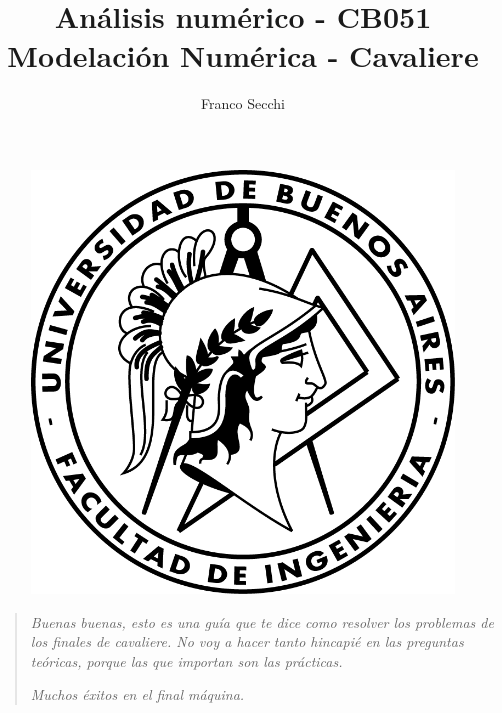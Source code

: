 \documentclass{style}
\begin{document}
	
	\begin{figure}
		\centering
		\includegraphics[scale=1.2]{logo_fiuba.png}
		\label{fig:FIUBA}
	\end{figure}
	
	\title{Análisis numérico - CB051 Modelación Numérica - Cavaliere}
	\author{Franco Secchi}
	\maketitle
    	
	\renewcommand{\contentsname}{Contenidos} 
	\begin{quote}
         \textit{Buenas buenas, esto es una guía que te dice como resolver los problemas de los finales de cavaliere. No voy a hacer tanto hincapié en las preguntas teóricas, porque las que importan son las prácticas.}
         
        \textit{Muchos éxitos en el final máquina.}
        
    \end{quote}
	\tableofcontents
    
    \FloatBarrier
    
    \FloatBarrier
    
    \FloatBarrier
    
    \FloatBarrier
    
\end{document}
